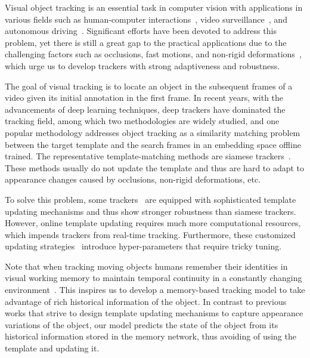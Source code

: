 \documentclass[final]{cvpr}
\begin{document}
Visual object tracking is an essential task in computer vision with applications in various fields such as human-computer interactions~\cite{liu2012hand}, video surveillance~\cite{xing2010multiple}, and autonomous driving~\cite{lee2015road}.
Significant efforts have been devoted to address this problem, yet there is still a great gap to the practical applications due to the challenging factors such as occlusions, fast motions, and non-rigid deformations~\cite{fan2019lasot,otb2015,kristan2018sixth}, which urge us to develop trackers with strong adaptiveness and robustness.
\par
The goal of visual tracking is to locate an object in the subsequent frames of a video given its initial annotation in the first frame.
In recent years, with the advancements of deep learning techniques, deep trackers have dominated the tracking field, among which two methodologies are widely studied, and one popular methodology addresses object tracking as a similarity matching problem between the target template and the search frames in an embedding space offline trained.
The representative template-matching methods are siamese trackers~\cite{bertinetto2016fully,zhu2018distractor,zhang2019deeper,fan2019siamese,wang2019fast,chen2020siamese,li2018high,li2019siamrpn++,xu2020siamfc++,guo2020siamcar}.
These methods usually do not update the template and thus are hard to adapt to appearance changes caused by occlusions, non-rigid deformations, etc.
\par
To solve this problem, some trackers~\cite{bhat2019learning,danelljan2020probabilistic} are equipped with sophisticated template updating mechanisms and thus show stronger robustness than siamese trackers.
However, online template updating requires much more computational resources, which impends trackers from real-time tracking.
Furthermore, these customized updating strategies~\cite{guo2017learning,yang2018learning,zhu2018distractor,li2019gradnet,yu2020deformable,choi2019deep} introduce hyper-parameters that require tricky tuning.
\par
Note that when tracking moving objects humans remember their identities in visual working memory to maintain temporal continuity in a constantly changing environment~\cite{makovski2009role}.
This inspires us to develop a memory-based tracking model to take advantage of rich historical information of the object.
In contrast to previous works that strive to design template updating mechanisms to capture appearance variations of the object, our model predicts the state of the object from its historical information stored in the memory network, thus avoiding of using the template and updating it.
\end{document}
